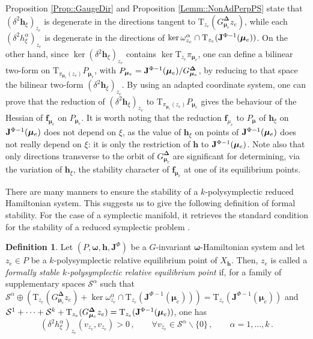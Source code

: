 \documentclass[11pt]{article}
\theoremstyle{plain}
\theoremstyle{definition}
\newtheorem{definition}[theorem]{Definition}
\newcommand{\T}{\mathrm{T}}
\newcommand{\bomega}{{\boldsymbol{\omega}}}
\newcommand{\bh}{{\boldsymbol{h}}}
\numberwithin{equation}{section}
\begin{document}
Proposition \ref{Prop::GaugeDir} and Proposition \ref{Lemm::NonAdPerpPS} state that $\left(\delta^2 \boldsymbol{h}_{\xi} \right)_{z_e}$ is degenerate in the directions tangent to $\T_{z_e}\left(G^{\boldsymbol{\Delta}}_{\boldsymbol{\mu}_e}z_e\right)$, while each $(\delta^2{ h}^\alpha_\xi)_{z_e}$ is degenerate in the directions of $\ker\omega^\alpha_{z_e}\cap \T_{z_e}({\bf J}^{\Phi-1}(\bm\mu_e))$. On the other hand, since $\ker (\delta^2{\bm h}_{\xi})_{z_e}$ contains $\ker \T_{z_e}\pi_{\bm \mu_{e}}$, one can define a bilinear two-form on $\T_{\pi_{\bm \mu_{e}}(z_e)}P_{\bm \mu_{e}}$, with $P_{\bm \mu_{e}}={\bf J}^{\Phi-1}({\bm \mu}_{e})/G^{\bm\Delta}_{\bm\mu_{e}}$, by reducing to that space  the bilinear two-form $(\delta^2{\bm h}_{\xi})_{z_e}$. By using an adapted coordinate system, one can prove that the reduction of $(\delta^2{\bm h}_{\xi})_{z_e}$ to $\T_{\pi_{\bm \mu_{e}}(z_e)}P_{\bm \mu_{e}}$ gives the behaviour of the Hessian of ${\bm f}_{\bm\mu_{e}}$ on $P_{\bm \mu_{e}}$. It is worth noting that the reduction ${\bm f}_{\mu_{e}}$ to $P_{\bm\mu}$ of ${\bm h}_\xi$ on ${\bf J}^{\Phi-1}(\bm\mu_e)$ does not depend on $\xi$, as the value of ${\bm h}_\xi$ on points of ${\bf J}^{\Phi-1}(\bm \mu_{e})$ does not really depend on $\xi$: it is only the restriction of $\bm h$ to ${\bf J}^{\Phi-1}(\bm \mu_{e})$. Note also that only directions transverse to the orbit of $G^{\boldsymbol{\Delta}}_{\boldsymbol{\mu}_e}$ are significant for determining, via the variation of ${\bm h}_\xi$, the stability character of ${\bm f}_{\bm\mu_{e}}$ at one of its equilibrium points.  

There are many manners to ensure the stability of a $k$-polysymplectic reduced Hamiltonian system. This suggests us to give the following definition of formal stability. For the case of a symplectic manifold, it retrieves the standard condition for the stability of a reduced symplectic problem \cite{MS_88}. 

\begin{definition}
\label{Prop::SecDerivEM}
Let $(P,\bomega,\bh,\mathbf{J}^\Phi)$ be a $G$-invariant $\bomega$-Hamiltonian system and let $z_e\in P$ be a $k$-polysymplectic relative equilibrium point of  $X_\bh$. Then, $z_e$ is called a {\it formally  stable $k$-polysymplectic relative equilibrium point} if, for a family of supplementary spaces $\mathcal{S}^\alpha$ such that $\mathcal{S}^\alpha\oplus( \T_{z_e}(G^{\boldsymbol{\Delta}}_{\boldsymbol{\mu}_e}z_e) + \ker\omega^\alpha_{z_e}\cap \T_{z_e}(\mathbf{J}^{\Phi-1}(\boldsymbol{\mu}_e)))=\T_{z_e}(\mathbf{J}^{\Phi-1}(\boldsymbol{\mu}_e))$ and $\mathcal{S}^1+\dotsb+\mathcal{S}^k+\T_{z_e}(G^{\bm\Delta}_{\bm\mu_e}z_e)=\T_{z_e}({\bf J}^{\Phi-1}(\bm\mu_e))$, one has
\begin{equation}\label{eq:FS}
    \left(\delta^2 { h}^\alpha_\xi\right)_{z_e}(v_{z_e},v_{z_e}) > 0\,,\qquad \forall v_{z_e}\in \mathcal{S}^\alpha\backslash\{0\}\,,\qquad \alpha=1,\ldots,k\,.
\end{equation}
\end{definition}
\end{document}
